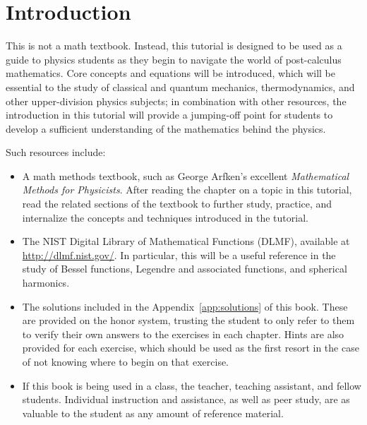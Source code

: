 \chapter{Introduction}

This is not a math textbook. Instead, this tutorial is designed to be used as a
guide to physics students as they begin to navigate the world of post-calculus
mathematics. Core concepts and equations will be introduced, which will be
essential to the study of classical and quantum mechanics, thermodynamics, and
other upper-division physics subjects; in combination with other resources, the
introduction in this tutorial will provide a jumping-off point for students to
develop a sufficient understanding of the mathematics behind the physics.

Such resources include:

\begin{itemize}

\item A math methods textbook, such as George Arfken's excellent
\textit{Mathematical Methods for Physicists}. After reading the chapter on a
topic in this tutorial, read the related sections of the textbook to further
study, practice, and internalize the concepts and techniques introduced in the
tutorial.

\item The NIST Digital Library of Mathematical Functions (DLMF), available at
\url{http://dlmf.nist.gov/}. In particular, this will be a useful reference in
the study of Bessel functions, Legendre and associated functions, and spherical
harmonics.

\item The solutions included in the Appendix~\ref{app:solutions} of this book.
These are provided on the honor system, trusting the student to only refer to
them to verify their own answers to the exercises in each chapter. Hints are
also provided for each exercise, which should be used as the first resort in
the case of not knowing where to begin on that exercise.

\item If this book is being used in a class, the teacher, teaching assistant,
and fellow students. Individual instruction and assistance, as well as peer
study, are as valuable to the student as any amount of reference material.

\end{itemize}
